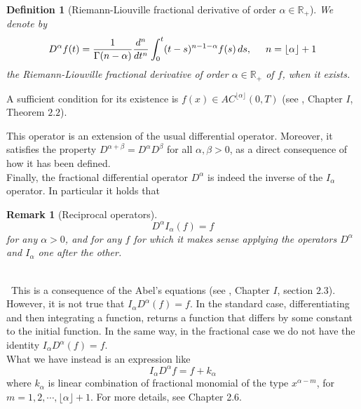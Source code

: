 \documentclass[a4paper,italian,11pt]{book}
\newtheorem{remark}{Remark}
\theoremstyle{plain}
\newtheorem{definition}{Definition}
\theoremstyle{remark}
\theoremstyle{plain}
\begin{document}
\begin{definition}[Riemann-Liouville fractional derivative of order $\alpha\in \mathbb{R}_+$]
We denote by
\begin{equation}
    \label{eq: fractional.deriv.general}
    D^\alpha f(t) = \frac{1}{\Gamma(n-\alpha)}\frac{d^n}{dt^n} \int_0^t (t-s)^{n-1-\alpha}f(s)\,ds, \hspace{0.5cm} n = \lfloor \alpha \rfloor+1
\end{equation}
the Riemann-Liouville fractional derivative of order $\alpha\in \mathbb{R}_+$ of $f$, when it exists.
\end{definition}

A sufficient condition for its existence is $f(x) \in AC^{\lfloor \alpha \rfloor}(0,T)$  (see \cite{libro19}, Chapter $I$, Theorem $2.2$).

This operator is an extension of the usual differential operator. Moreover, it satisfies the property $D^{\alpha + \beta} = D^\alpha D^\beta$ for all $\alpha, \beta>0$, as a direct consequence of how it has been defined. 
\\

Finally, the fractional differential operator $D^\alpha$ is indeed the inverse of the $I_\alpha$ operator. In particular it holds that
\begin{remark}[Reciprocal operators]
\begin{equation}
    \label{eq: inverseDF}
    D^\alpha I_\alpha(f) = f 
\end{equation}
for any $\alpha >0$, and for any $f$ for which it makes sense applying the operators $D^\alpha$ and $I_\alpha$ one after the other.
\end{remark}
\\\
This is a consequence of the Abel's equations (see \cite{libro19}, Chapter $I$, section $2.3$).
\\
However, it is not true that $I_\alpha D^\alpha(f)=f$. In the standard case, differentiating and then integrating a function, returns a function that differs by some constant to the initial function. 
In the same way, in the fractional case we do not have the identity $I_\alpha D^\alpha(f) = f$. \\ What we have instead is an expression like
\begin{equation}
    \label{eq: integrateafterdifferentiate}
    I_\alpha D^\alpha f = f + k_\alpha
\end{equation}
where $k_\alpha$ is linear combination of fractional monomial of the type $x^{\alpha - m}$, for $m=1,2,\cdots, \lfloor \alpha \rfloor +1$. For more details, see \cite{libro19} Chapter 2.6.
 
\end{document}
